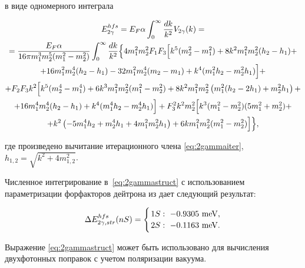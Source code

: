 в виде одномерного интеграла

\begin{multline}

\label{eq:2gammastruct}

E_{2\gamma}^{hfs}=E_F\alpha\int_0^\infty\frac{dk}{k^2}V_{2\gamma}(k)=

\\

=\frac{E_F\alpha}{16\pi m_1^3m_2^5(m_1^2-m_2^2)}

\int_0^\infty\frac{dk}{k^2}\Bigl\{4m_1^2m_2^2F_1F_3 \Bigl[k^5(m_2^2-m_1^2)+8k^2m_1^2m_2^2(h_2-h_1)+

\\

+

16m_1^2m_2^4(h_2-h_1)-32m_1^2m_2^4(m_2-m_1)+k^4(m_1^2h_2-m_2^2h_1)\Bigr]+

\\

+F_2 F_3k^2\Bigl[k^5(m_2^4-m_1^4)+6k^3m_1^2m_2^2(m_1^2-m_2^2)+8k^2m_1^2m_2^2\left(m_1^2(h_2-2h_1)+

m_2^2h_1\right)+

\\

+

16m_1^4m_2^4(h_2-h_1)+k^4(m_1^4h_2-m_2^4h_1)\Bigr]+

F_3^2k^2m_2^2 \Bigl[k^3(m_1^2-m_2^2)(5m_1^2+m_2^2)+

\\

+k^2\left(-5m_1^4h_2+m_2^4h_1+4m_1^2m_2^2h_1\right)+6km_1^2m_2^2(m_1^2-m_2^2)\Bigr]\Bigr\},

\end{multline}

где произведено вычитание итерационного члена \eqref{eq:2gammaiter}, $h_{1,2}=\sqrt{k^2+4m_{1,2}^2}$.

Численное интегрирование в~\eqref{eq:2gammastruct} с использованием параметризации форфакторов дейтрона из \cite{abbott} дает следующий результат:

\begin{equation}

\label{eq:2gamma_struct}

\Delta E^{hfs}_{2\gamma,str}(nS)=\Biggl\{{{1S:~-0.9305~\rm meV,}\atop{2S:~-0.1163~\rm meV.}}

\end{equation}



Выражение \eqref{eq:2gammastruct} может быть использовано для вычисления двухфотонных поправок с учетом поляризации вакуума.

